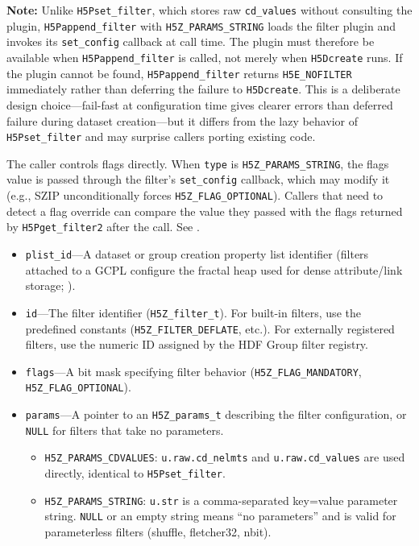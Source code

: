 \documentclass[../RFC-HDFG-2026-001.tex]{subfiles}
\begin{document}
\textbf{Note:} Unlike \texttt{H5Pset\_filter}, which stores raw \texttt{cd\_values}
without consulting the plugin, \texttt{H5Pappend\_filter} with
\texttt{H5Z\_PARAMS\_STRING} loads the filter plugin and invokes its
\texttt{set\_config} callback at call time. The plugin must therefore be
available when \texttt{H5Pappend\_filter} is called, not merely when
\texttt{H5Dcreate} runs. If the plugin cannot be found,
\texttt{H5Pappend\_filter} returns \texttt{H5E\_NOFILTER} immediately rather
than deferring the failure to \texttt{H5Dcreate}. This is a deliberate
design choice---fail-fast at configuration time gives clearer errors than
deferred failure during dataset creation---but it differs from the lazy
behavior of \texttt{H5Pset\_filter} and may surprise callers porting
existing code.

The caller controls flags directly.  When \texttt{type} is
\texttt{H5Z\_PARAMS\_STRING}, the flags value is passed through the filter's
\texttt{set\_config} callback, which may modify it (e.g., SZIP unconditionally
forces \texttt{H5Z\_FLAG\_OPTIONAL}).  Callers that need to detect a flag
override can compare the value they passed with the flags returned by
\texttt{H5Pget\_filter2} after the call.  See .


\begin{itemize}
\item \texttt{plist\_id}---A dataset or group creation property list
  identifier (filters attached to a GCPL configure the fractal heap used
  for dense attribute/link storage; ).
\item \texttt{id}---The filter identifier (\texttt{H5Z\_filter\_t}).  For
  built-in filters, use the predefined constants
  (\texttt{H5Z\_FILTER\_DEFLATE}, etc.).  For externally registered filters,
  use the numeric ID assigned by the HDF Group filter registry.
\item \texttt{flags}---A bit mask specifying filter behavior
  (\texttt{H5Z\_FLAG\_MANDATORY}, \texttt{H5Z\_FLAG\_OPTIONAL}).
\item \texttt{params}---A pointer to an \texttt{H5Z\_params\_t} describing the
  filter configuration, or \texttt{NULL} for filters that take no parameters.
  \begin{itemize}
  \item \texttt{H5Z\_PARAMS\_CDVALUES}: \texttt{u.raw.cd\_nelmts} and
    \texttt{u.raw.cd\_values} are used directly, identical to
    \texttt{H5Pset\_filter}.
  \item \texttt{H5Z\_PARAMS\_STRING}: \texttt{u.str} is a comma-separated
    key=value parameter string.  \texttt{NULL} or an empty string means ``no
    parameters'' and is valid for parameterless filters (shuffle, fletcher32,
    nbit).
  \end{itemize}
\end{itemize}
\end{document}
